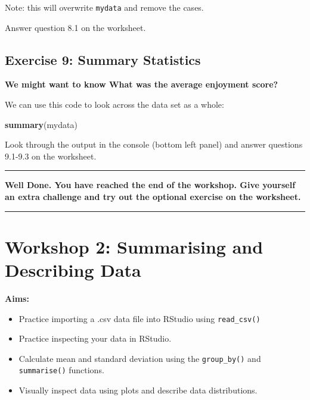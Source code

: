 \documentclass[
]{book}
\newenvironment{Shaded}{\begin{snugshade}}{\end{snugshade}}
\newcommand{\FunctionTok}[1]{\textcolor[rgb]{0.13,0.29,0.53}{\textbf{#1}}}
\newcommand{\NormalTok}[1]{#1}
\let\oldsection\section
\renewcommand{\section}{\needspace{5\baselineskip}\oldsection}
\begin{document}
Note: this will overwrite \texttt{mydata} and remove the cases.

Answer question 8.1 on the worksheet.

\section{Exercise 9: Summary Statistics}\label{exercise-9-summary-statistics}

\textbf{We might want to know What was the average enjoyment score?}

We can use this code to look across the data set as a whole:

\begin{Shaded}
\begin{Highlighting}[]
\FunctionTok{summary}\NormalTok{(mydata)}
\end{Highlighting}
\end{Shaded}

Look through the output in the console (bottom left panel) and answer questions 9.1-9.3 on the worksheet.

\begin{center}\rule{0.5\linewidth}{0.5pt}\end{center}

\textbf{Well Done. You have reached the end of the workshop. Give yourself an extra challenge and try out the optional exercise on the worksheet.}

\begin{center}\rule{0.5\linewidth}{0.5pt}\end{center}

\chapter{Workshop 2: Summarising and Describing Data}\label{workshop-2-summarising-and-describing-data}

\textbf{Aims:}

\begin{itemize}
\item
  Practice importing a .csv data file into RStudio using \texttt{read\_csv()}
\item
  Practice inspecting your data in RStudio.
\item
  Calculate mean and standard deviation using the \texttt{group\_by()} and \texttt{summarise()} functions.
\item
  Visually inspect data using plots and describe data distributions.
\end{itemize}
\end{document}
